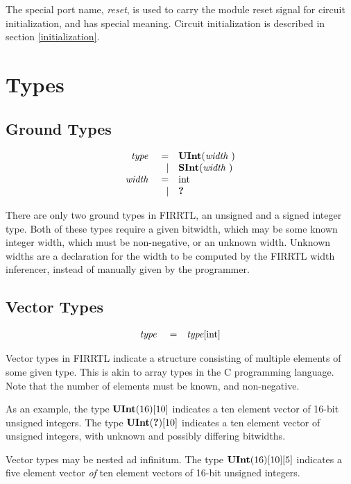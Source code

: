 \documentclass[12pt]{article}
\begin{document}
The special port name, {\em reset}, is used to carry the module reset signal for circuit initialization, and has special meaning. Circuit initialization is described in section \ref{initialization}. 

\section{Types}

\subsection{Ground Types}
\[
\begin{array}{rrl}
\text{\em type\ }       &=     &\text{\bf UInt}(\text{\em width\ })      \\
                &\vert &\text{\bf SInt}(\text{\em width\ })      \\
\text{\em width\ }      &=     &\text{int}                       \\
                &\vert &\text{\bf ?\ }                      \\
\end{array}
\]

There are only two ground types in FIRRTL, an unsigned and a signed integer type. Both of these types require a given bitwidth, which may be some known integer width, which must be non-negative, or an unknown width. Unknown widths are a declaration for the width to be computed by the FIRRTL width inferencer, instead of manually given by the programmer.

\subsection{Vector Types}
\[
\begin{array}{rrl}
\text{\em type\ }       &=     &\text{\em type}[\text{int}]           \\
\end{array}
\]

Vector types in FIRRTL indicate a structure consisting of multiple elements of some given type. This is akin to array types in the C programming language. Note that the number of elements must be known, and non-negative.

As an example, the type $\text{\bf UInt}(16)[10]$ indicates a ten element vector of 16-bit unsigned integers. The type $\text{\bf UInt}(\text{\bf ?})[10]$ indicates a ten element vector of unsigned integers, with unknown and possibly differing bitwidths.

Vector types may be nested ad infinitum. The type $\text{\bf UInt}(16)[10][5]$ indicates a five element vector {\em of} ten element vectors of 16-bit unsigned integers.
\end{document}
